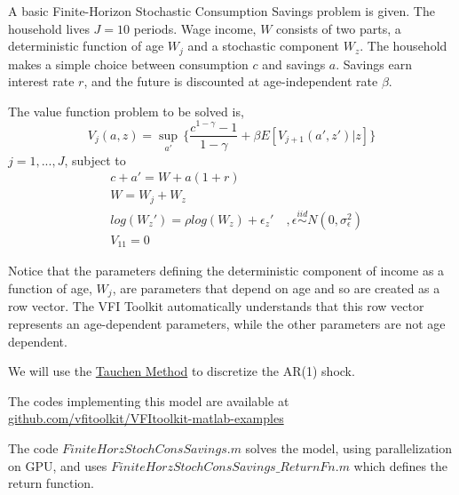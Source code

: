 %
 
A basic Finite-Horizon Stochastic Consumption Savings problem is given. The household lives $J=10$ periods.
Wage income, $W$ consists of two parts, a deterministic function of age $W_j$ and a stochastic component $W_z$.
The household makes a simple choice between consumption $c$ and savings $a$. Savings earn interest rate $r$, and 
the future is discounted at age-independent rate $\beta$.

The value function problem to be solved is,
\begin{equation*}
 V_j(a,z)=\sup_{a'} \, \{ \frac{c^{1-\gamma}-1}{1-\gamma}+\beta E[V_{j+1}(a',z')|z] \}
\end{equation*}
$j=1,...,J$, subject to
\begin{eqnarray}
 & c+a'= W + a(1+r) \\
 & W =W_j+W_z\\
 & log(W_z')=\rho log(W_z) +\epsilon_z' \quad ,\epsilon \overset{iid}{\sim} N(0,\sigma_{\epsilon}^2) \\
 & V_{11}=0
\end{eqnarray}

Notice that the parameters defining the deterministic component of income as a function of age, $W_j$, are parameters that depend on age and so are 
created as a row vector. The VFI Toolkit automatically understands that this row vector represents an age-dependent parameters, while the other parameters
are not age dependent.

We will use the \href{appendix:TauchenMethod}{Tauchen Method} to discretize the AR(1) shock.

The codes implementing this model are available at  \href{https://github.com/vfitoolkit/VFItoolkit-matlab-examples}{github.com/vfitoolkit/VFItoolkit-matlab-examples}

The code $FiniteHorzStochConsSavings.m$ solves the model, using parallelization on GPU, and uses $FiniteHorzStochConsSavings\_{}ReturnFn.m$ which defines the return function. \\